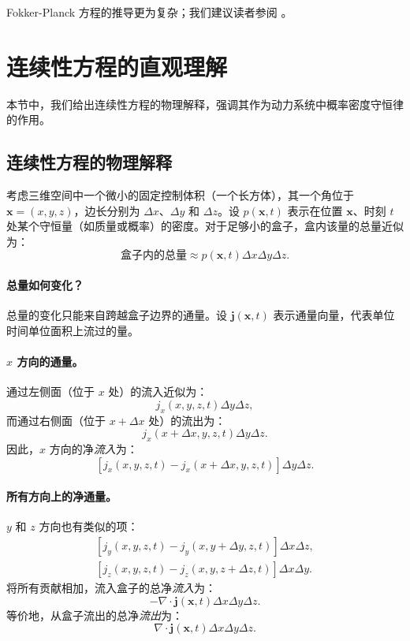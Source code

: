 Fokker-Planck 方程的推导更为复杂；我们建议读者参阅 。






\newpage
\clearpage

\section{连续性方程的直观理解}\label{sec:intuition-continuity}
本节中，我们给出连续性方程的物理解释，强调其作为动力系统中概率密度守恒律的作用。

\subsection{连续性方程的物理解释}

考虑三维空间中一个微小的固定控制体积（一个长方体），其一个角位于 $\mathbf{x} = (x, y, z)$，边长分别为 $\Delta x$、$\Delta y$ 和 $\Delta z$。设 $p(\mathbf{x}, t)$ 表示在位置 $\mathbf{x}$、时刻 $t$ 处某个守恒量（如质量或概率）的密度。对于足够小的盒子，盒内该量的总量近似为：
\[
\text{盒子内的总量} \approx p(\mathbf{x}, t) \Delta x \Delta y \Delta z.
\]

\paragraph{总量如何变化？}
总量的变化只能来自跨越盒子边界的通量。设 $\mathbf{j}(\mathbf{x}, t)$ 表示通量向量，代表单位时间单位面积上流过的量。

\paragraph{$x$ 方向的通量。}
通过左侧面（位于 $x$ 处）的流入近似为：
\[
j_x(x, y, z, t) \Delta y \Delta z,
\]
而通过右侧面（位于 $x + \Delta x$ 处）的流出为：
\[
j_x(x + \Delta x, y, z, t) \Delta y \Delta z.
\]
因此，$x$ 方向的净\emph{流入}为：
\[
\left[ j_x(x, y, z, t) - j_x(x + \Delta x, y, z, t) \right] \Delta y \Delta z.
\]

\paragraph{所有方向上的净通量。}
$y$ 和 $z$ 方向也有类似的项：
\begin{align*}
\left[ j_y(x, y, z, t) - j_y(x, y + \Delta y, z, t) \right] \Delta x \Delta z, \\
\left[ j_z(x, y, z, t) - j_z(x, y, z + \Delta z, t) \right] \Delta x \Delta y.
\end{align*}
将所有贡献相加，流入盒子的总净\emph{流入}为：
\[
- \nabla \cdot \mathbf{j}(\mathbf{x}, t) \Delta x \Delta y \Delta z.
\]
等价地，从盒子流出的总净\emph{流出}为：
\[
\nabla \cdot \mathbf{j}(\mathbf{x}, t) \Delta x \Delta y \Delta z.
\]


